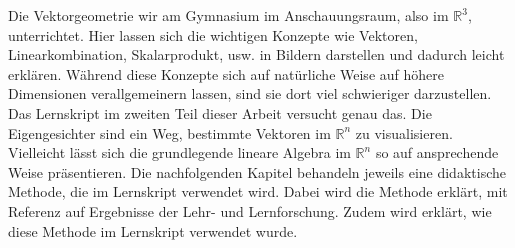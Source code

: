 Die Vektorgeometrie wir am Gymnasium im Anschauungsraum, also im $\mathbb R^3$, unterrichtet.
Hier lassen sich die wichtigen Konzepte wie Vektoren, Linearkombination, Skalarprodukt, usw. in Bildern darstellen und dadurch leicht erklären.
Während diese Konzepte sich auf natürliche Weise auf höhere Dimensionen verallgemeinern lassen, sind sie dort viel schwieriger darzustellen.
Das Lernskript im zweiten Teil dieser Arbeit versucht genau das.
Die Eigengesichter sind ein Weg, bestimmte Vektoren im $\mathbb R^n$ zu visualisieren.
Vielleicht lässt sich die grundlegende lineare Algebra im $\mathbb R^n$ so auf ansprechende Weise präsentieren.
Die nachfolgenden Kapitel behandeln jeweils eine didaktische Methode, die im Lernskript verwendet wird.
Dabei wird die Methode erklärt, mit Referenz auf Ergebnisse der Lehr- und Lernforschung.
Zudem wird erklärt, wie diese Methode im Lernskript verwendet wurde.
